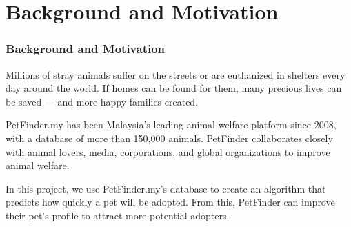 

\section{Background and Motivation}
\begin{frame}\frametitle{Background and Motivation}
    Millions of stray animals suffer on the streets or are euthanized in shelters every day around the world. If homes can be found for them, many precious lives can be saved --- and more happy families created. 

PetFinder.my has been Malaysia's leading animal welfare platform since 2008, with a database of more than 150,000 animals. PetFinder collaborates closely with animal lovers, media, corporations, and global organizations to improve animal welfare.

In this project, we use PetFinder.my's database to create an algorithm that predicts how quickly a pet will be adopted. From this, PetFinder can improve their pet's profile to attract more potential adopters. 

\end{frame}

